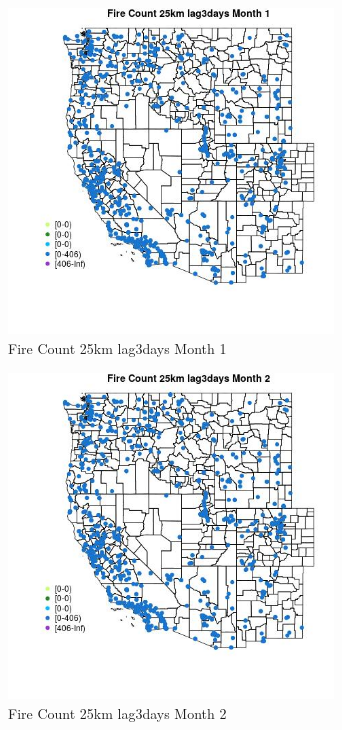 \begin{figure} 
\centering  
\includegraphics[width=0.77\textwidth]{Code_Outputs/Report_ML_input_PM25_Step4_part_f_de_duplicated_aves_prioritize_24hr_obswNAs_MapObsMo1Fire_Count_25km_lag3days.jpg} 
\caption{\label{fig:Report_ML_input_PM25_Step4_part_f_de_duplicated_aves_prioritize_24hr_obswNAsMapObsMo1Fire_Count_25km_lag3days}Fire Count 25km lag3days Month 1} 
\end{figure} 
 

\begin{figure} 
\centering  
\includegraphics[width=0.77\textwidth]{Code_Outputs/Report_ML_input_PM25_Step4_part_f_de_duplicated_aves_prioritize_24hr_obswNAs_MapObsMo2Fire_Count_25km_lag3days.jpg} 
\caption{\label{fig:Report_ML_input_PM25_Step4_part_f_de_duplicated_aves_prioritize_24hr_obswNAsMapObsMo2Fire_Count_25km_lag3days}Fire Count 25km lag3days Month 2} 
\end{figure} 
 

